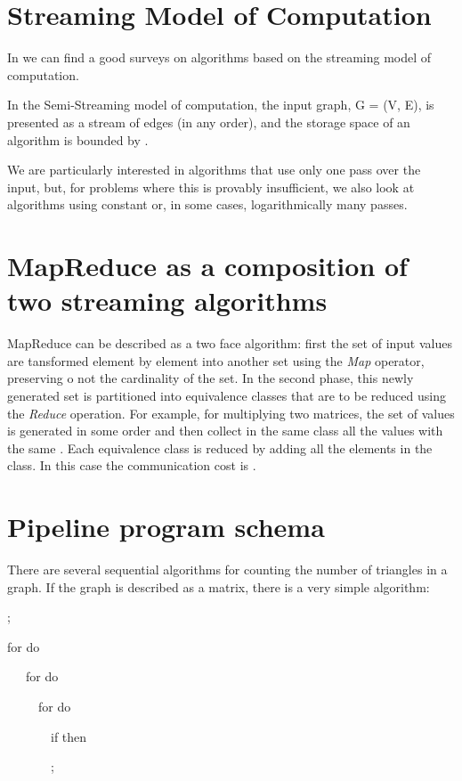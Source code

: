 \documentclass{article}                     \usepackage{graphics}
\begin{document}
\section{Streaming Model of Computation} 

In \cite{McGregor:2014:GSA:2627692.2627694,survey}  we can find a good surveys on  algorithms  based on the streaming model of computation. 

In the Semi-Streaming model of computation, the input graph,
G = (V, E), is presented as a stream of edges (in any order),
and the storage space of an algorithm is bounded by . 

We are particularly interested in algorithms that use
only one pass over the input, but, for problems where this is provably
insufficient, we also look at algorithms using constant or, in some cases,
logarithmically many passes. 


\section{MapReduce as a composition of two streaming algorithms}\label{CTMapReduce}

MapReduce can be described as a two face algorithm: first the set of input values are tansformed element by element into another set using the \textit{Map} operator,  preserving o not the cardinality of the set. In the second phase, this newly generated set is partitioned into equivalence classes  that are to be reduced using the \textit{Reduce} operation.  For example, for multiplying two matrices, the set of values  is generated in some order and then collect in the same class all the values with the same .  Each equivalence class is reduced by adding all the elements in the class. In this case the communication cost is .

\section{Pipeline program schema}
There are several sequential algorithms  for counting the number of triangles in a graph. If the graph is described as a matrix, there is a very simple algorithm: 


 ;

for  do

\ \ \ for  do

\ \ \ \ \ for  do

\ \ \ \ \ \ \ if  then

\ \ \ \ \ \ \ ;
\end{document}
